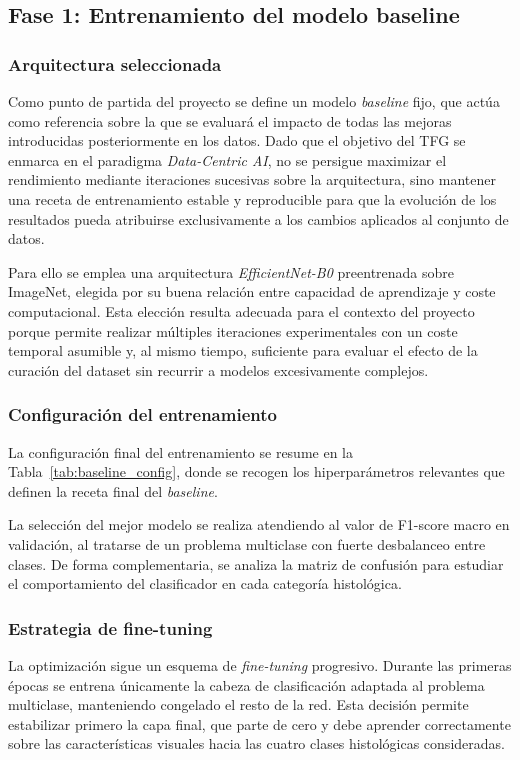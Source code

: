 ﻿\documentclass[10pt,a4paper,twocolumn,twoside]{article}
\begin{document}
\subsection{Fase 1: Entrenamiento del modelo baseline}

\subsubsection{Arquitectura seleccionada}
Como punto de partida del proyecto se define un modelo \textit{baseline} fijo, que actúa como referencia sobre la que se evaluará el impacto de todas las mejoras introducidas posteriormente en los datos. Dado que el objetivo del TFG se enmarca en el paradigma \textit{Data-Centric AI}, no se persigue maximizar el rendimiento mediante iteraciones sucesivas sobre la arquitectura, sino mantener una receta de entrenamiento estable y reproducible para que la evolución de los resultados pueda atribuirse exclusivamente a los cambios aplicados al conjunto de datos.

Para ello se emplea una arquitectura \textit{EfficientNet-B0} preentrenada sobre ImageNet\cite{tan2019efficientnet}, elegida por su buena relación entre capacidad de aprendizaje y coste computacional. Esta elección resulta adecuada para el contexto del proyecto porque permite realizar múltiples iteraciones experimentales con un coste temporal asumible y, al mismo tiempo, suficiente para evaluar el efecto de la curación del dataset sin recurrir a modelos excesivamente complejos.

\subsubsection{Configuración del entrenamiento}
La configuración final del entrenamiento se resume en la Tabla~\ref{tab:baseline_config}, donde se recogen los hiperparámetros relevantes que definen la receta final del \textit{baseline}.

La selección del mejor modelo se realiza atendiendo al valor de F1-score macro en validación, al tratarse de un problema multiclase con fuerte desbalanceo entre clases. De forma complementaria, se analiza la matriz de confusión para estudiar el comportamiento del clasificador en cada categoría histológica.

\subsubsection{Estrategia de fine-tuning}
La optimización sigue un esquema de \textit{fine-tuning} progresivo. Durante las primeras épocas se entrena únicamente la cabeza de clasificación adaptada al problema multiclase, manteniendo congelado el resto de la red. Esta decisión permite estabilizar primero la capa final, que parte de cero y debe aprender correctamente sobre las características visuales hacia las cuatro clases histológicas consideradas.
\end{document}
